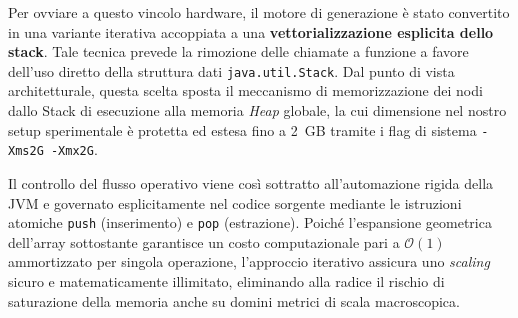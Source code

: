 \documentclass[12pt, a4paper]{article}
\begin{document}
	Per ovviare a questo vincolo hardware, il motore di generazione è stato convertito in una variante iterativa accoppiata a una \textbf{vettorializzazione esplicita dello stack}. Tale tecnica prevede la rimozione delle chiamate a funzione a favore dell'uso diretto della struttura dati \texttt{java.util.Stack}. Dal punto di vista architetturale, questa scelta sposta il meccanismo di memorizzazione dei nodi dallo Stack di esecuzione alla memoria \textit{Heap} globale, la cui dimensione nel nostro setup sperimentale è protetta ed estesa fino a 2~GB tramite i flag di sistema \texttt{-Xms2G -Xmx2G}. 
	
	Il controllo del flusso operativo viene così sottratto all'automazione rigida della JVM e governato esplicitamente nel codice sorgente mediante le istruzioni atomiche \texttt{push} (inserimento) e \texttt{pop} (estrazione). Poiché l'espansione geometrica dell'array sottostante garantisce un costo computazionale pari a $\mathcal{O}(1)$ ammortizzato per singola operazione, l'approccio iterativo assicura uno \textit{scaling} sicuro e matematicamente illimitato, eliminando alla radice il rischio di saturazione della memoria anche su domini metrici di scala macroscopica.
	
\end{document}
